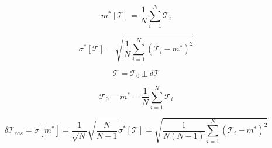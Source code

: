 \documentclass[12pt, twoside, a4paper]{article}
\begin{document}
\begin{equation}
m^*[\mathcal{T}] = \frac{1}{N} \sum_{i=1}^{N} \mathcal{T}_i
\end{equation}

\begin{equation}
\sigma^*[\mathcal{T}] = \sqrt{\frac{1}{N} \sum_{i=1}^{N} (\mathcal{T}_i - m^*)^2}
\end{equation}

\begin{equation}
\mathcal{T} = \mathcal{T}_0 \pm \delta\mathcal{T}
\end{equation}

\begin{equation}
\mathcal{T}_0 = m^* = \frac{1}{N} \sum_{i=1}^{N} \mathcal{T}_i
\end{equation}

\begin{equation}
\delta\mathcal{T}_{cas} = \tilde{\sigma}[m^*] = \frac{1}{\sqrt{N}} \sqrt{\frac{N}{N - 1}}\sigma^*[\mathcal{T}] = \sqrt{\frac{1}{N(N - 1)} \sum_{i=1}^{N} (\mathcal{T}_i - m^*)^2}
\end{equation}
\end{document}
